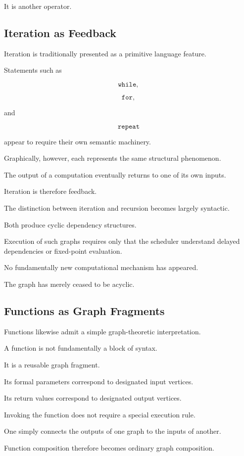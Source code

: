 \documentclass[12pt,oneside]{article}
\begin{document}
It is another operator.

\subsection{Iteration as Feedback}

Iteration is traditionally presented as a primitive language feature.

Statements such as

\[
\texttt{while},
\]

\[
\texttt{for},
\]

and

\[
\texttt{repeat}
\]

appear to require their own semantic machinery.

Graphically, however, each represents the same structural phenomenon.

The output of a computation eventually returns to one of its own inputs.

Iteration is therefore feedback.

The distinction between iteration and recursion becomes largely syntactic.

Both produce cyclic dependency structures.

Execution of such graphs requires only that the scheduler understand delayed dependencies or fixed-point evaluation.

No fundamentally new computational mechanism has appeared.

The graph has merely ceased to be acyclic.

\subsection{Functions as Graph Fragments}

Functions likewise admit a simple graph-theoretic interpretation.

A function is not fundamentally a block of syntax.

It is a reusable graph fragment.

Its formal parameters correspond to designated input vertices.

Its return values correspond to designated output vertices.

Invoking the function does not require a special execution rule.

One simply connects the outputs of one graph to the inputs of another.

Function composition therefore becomes ordinary graph composition.
\end{document}
